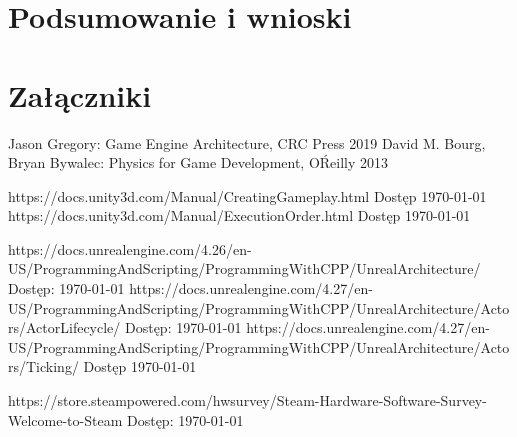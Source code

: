 \documentclass[12pt,twoside]{article}
\begin{document}
\clearpage
\section{Podsumowanie i wnioski}

\clearpage

\section*{Załączniki}



\clearpage


\begin{thebibliography}{4}
 Jason Gregory: Game Engine Architecture, CRC Press 2019
 David M. Bourg, Bryan Bywalec: Physics for Game Development, O\'Reilly 2013

 https://docs.unity3d.com/Manual/CreatingGameplay.html Dostęp \today
{} https://docs.unity3d.com/Manual/ExecutionOrder.html Dostęp \today

 https://docs.unrealengine.com/4.26/en-US/ProgrammingAndScripting/ProgrammingWithCPP/UnrealArchitecture/ Dostęp: \today
{} https://docs.unrealengine.com/4.27/en-US/ProgrammingAndScripting/ProgrammingWithCPP/UnrealArchitecture/Actors/ActorLifecycle/ Dostęp: \today
{} https://docs.unrealengine.com/4.27/en-US/ProgrammingAndScripting/ProgrammingWithCPP/UnrealArchitecture/Actors/Ticking/ Dostęp \today

 https://store.steampowered.com/hwsurvey/Steam-Hardware-Software-Survey-Welcome-to-Steam Dostęp: \today

\end{thebibliography}

\clearpage

\makesummary
\end{document}
